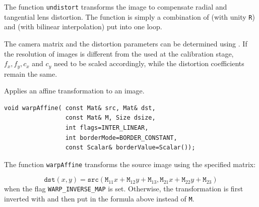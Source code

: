 The function \texttt{undistort} transforms the image to compensate
radial and tangential lens distortion. The function is simply a combination of  (with unity \texttt{R}) and  (with bilinear interpolation) put into one loop.

The camera matrix and the distortion parameters can be determined using
. If the resolution of images is different from the used at the calibration stage, $f_x, f_y, c_x$ and $c_y$
need to be scaled accordingly, while the distortion coefficients remain the same.

\label{warpAffine}
Applies an affine transformation to an image.

\begin{lstlisting}
void warpAffine( const Mat& src, Mat& dst,
                 const Mat& M, Size dsize,
                 int flags=INTER_LINEAR,
                 int borderMode=BORDER_CONSTANT,
                 const Scalar& borderValue=Scalar());
\end{lstlisting}
\begin{description}
\end{description}

The function \texttt{warpAffine} transforms the source image using the specified matrix:

\[
\texttt{dst}(x,y) = \texttt{src}(\texttt{M}_{11} x + \texttt{M}_{12} y + \texttt{M}_{13}, \texttt{M}_{21} x + \texttt{M}_{22} y + \texttt{M}_{23})
\]
when the flag \texttt{WARP\_INVERSE\_MAP} is set. Otherwise, the transformation is first inverted with  and then put in the formula above instead of \texttt{M}.

